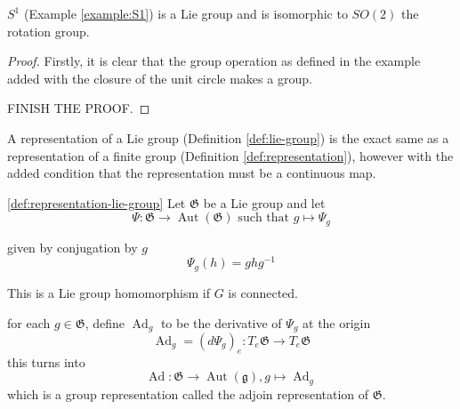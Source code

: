 \begin{proposition}
  $S^1$ (Example \ref{example:S1}) is a Lie group and is isomorphic to $SO(2)$ the rotation group.
\end{proposition}

\begin{proof}
Firstly, it is clear that the group operation as defined in the example added with the closure of the unit circle makes a group.

FINISH THE PROOF.
\end{proof}

\begin{definition}
\label{def:representation-lie-group}
A representation of a Lie group (Definition \ref{def:lie-group}) is the exact same as a representation of a finite group (Definition \ref{def:representation}), however with the added condition
  that the representation must be a continuous map.
\end{definition}


\begin{definition}
  \label{def:adjoint-representation}
\ref{def:representation-lie-group}
Let $\mathfrak{G}$ be a Lie group and let 
\[
  \Psi : \mathfrak{G} \to \operatorname{Aut}(\mathfrak{G}) \text{ such that } g \mapsto \Psi_g
\]

given by conjugation by $g$ 
\[
  \Psi_g(h) = ghg^{-1}
\]

This is a Lie group homomorphism if $G$ is connected. 

for each $g \in \mathfrak{G}$, define $\operatorname{Ad}_g$ to be the derivative of $\Psi_g$ at the origin
\[
  \operatorname{Ad}_g = (d\Psi_g)_e : T_e\mathfrak{G} \to T_e\mathfrak{G}
\]
this turns into 
\[
  \operatorname{Ad} : \mathfrak{G} \to \operatorname{Aut}(\mathfrak{g}), g \mapsto \operatorname{Ad}_g
\]
which is a group representation called the adjoin representation of $\mathfrak{G}$.
\end{definition}


